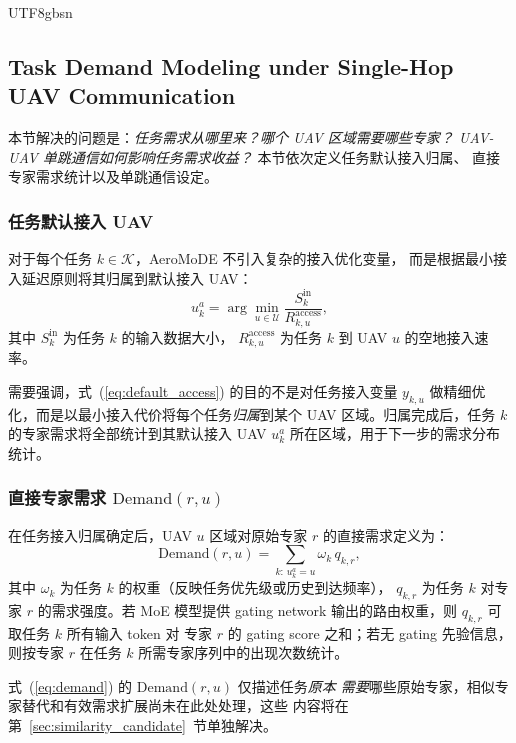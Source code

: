 \documentclass[conference]{IEEEtran}
\begin{document}
\begin{CJK*}{UTF8}{gbsn}
\subsection{Task Demand Modeling under Single-Hop UAV Communication}
\label{sec:demand_modeling}

本节解决的问题是：\emph{任务需求从哪里来？哪个 UAV 区域需要哪些专家？
UAV-UAV 单跳通信如何影响任务需求收益？} 本节依次定义任务默认接入归属、
直接专家需求统计以及单跳通信设定。

\subsubsection{任务默认接入 UAV}

对于每个任务 $k\in\mathcal{K}$，AeroMoDE 不引入复杂的接入优化变量，
而是根据最小接入延迟原则将其归属到默认接入 UAV：
\begin{equation}
u_k^a = \arg\min_{u\in\mathcal{U}} \frac{S_k^{\mathrm{in}}}{R_{k,u}^{\mathrm{access}}},
\label{eq:default_access}
\end{equation}
其中 $S_k^{\mathrm{in}}$ 为任务 $k$ 的输入数据大小，
$R_{k,u}^{\mathrm{access}}$ 为任务 $k$ 到 UAV $u$ 的空地接入速率。

需要强调，式~(\ref{eq:default_access}) 的目的不是对任务接入变量
$y_{k,u}$ 做精细优化，而是以最小接入代价将每个任务\emph{归属}到某个
UAV 区域。归属完成后，任务 $k$ 的专家需求将全部统计到其默认接入 UAV
$u_k^a$ 所在区域，用于下一步的需求分布统计。

\subsubsection{直接专家需求 \texorpdfstring{$\mathrm{Demand}(r,u)$}{Demand(r,u)}}

在任务接入归属确定后，UAV $u$ 区域对原始专家 $r$ 的直接需求定义为：
\begin{equation}
\mathrm{Demand}(r,u) = \sum_{k:\,u_k^a = u} \omega_k \, q_{k,r},
\label{eq:demand}
\end{equation}
其中 $\omega_k$ 为任务 $k$ 的权重（反映任务优先级或历史到达频率），
$q_{k,r}$ 为任务 $k$ 对专家 $r$ 的需求强度。若 MoE 模型提供 gating
network 输出的路由权重，则 $q_{k,r}$ 可取任务 $k$ 所有输入 token 对
专家 $r$ 的 gating score 之和；若无 gating 先验信息，则按专家 $r$
在任务 $k$ 所需专家序列中的出现次数统计。

式~(\ref{eq:demand}) 的 $\mathrm{Demand}(r,u)$ 仅描述任务\emph{原本
需要}哪些原始专家，相似专家替代和有效需求扩展尚未在此处处理，这些
内容将在第~\ref{sec:similarity_candidate}~节单独解决。


\end{CJK*}
\end{document}
